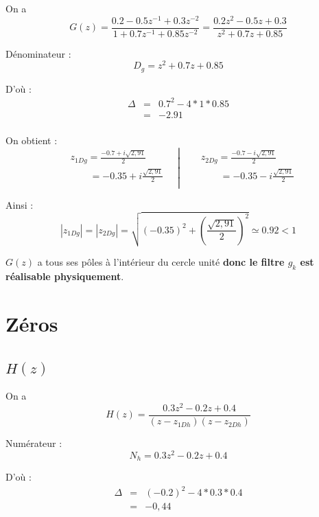 \documentclass[12,french]{report}
\begin{document}
\vspace{0.25cm}

On a $$ G(z) = \frac{0.2-0.5z^{-1}+0.3z^{-2}}{1+0.7z^{-1}+0.85z^{-2}} = \frac{0.2z^2-0.5z+0.3}{z^2+0.7z+0.85} $$

Dénominateur : $$ D_g= z^2+0.7z+0.85 $$

D'où : $$ \begin{array}{ccl}
\Delta & = & 0.7^2-4*1*0.85 \\
	   & = & -2.91 \\
\end{array} $$

On obtient :
$$\left.\begin{aligned}
	&z_{1Dg} = \frac{-0.7+i\sqrt{2,91}}{2} \\
	&\quad\quad = -0.35 + i\frac{\sqrt{2,91}}{2} \\
\end{aligned}\quad\right|
\quad\left.\begin{aligned}
	&z_{2Dg} = \frac{-0.7-i\sqrt{2,91}}{2}\\
	&\quad\quad =-0.35 - i\frac{\sqrt{2,91}}{2} \\
\end{aligned}\right.$$

Ainsi :
$$ |z_{1Dg}|=|z_{2Dg}|=\sqrt{(-0.35)^2+\left(\frac{\sqrt{2,91}}{2}\right)^2} \simeq 0.92 < 1 $$


$G(z)$ a tous ses pôles à l'intérieur du cercle unité \textbf{donc le filtre $g_k$ est réalisable physiquement}.

\section{Zéros}

\subsection{$H(z)$}

\vspace{0.25cm}

On a $$ H(z) = \frac{0.3z^2-0.2z+0.4}{(z-z_{1Dh})(z-z_{2Dh})} $$

Numérateur : $$ N_h= 0.3z^2-0.2z+0.4 $$

D'où : $$ \begin{array}{ccl}
\Delta & = & (-0.2)^2-4*0.3*0.4 \\
	   & = & -0,44 \\
\end{array} $$
\end{document}
